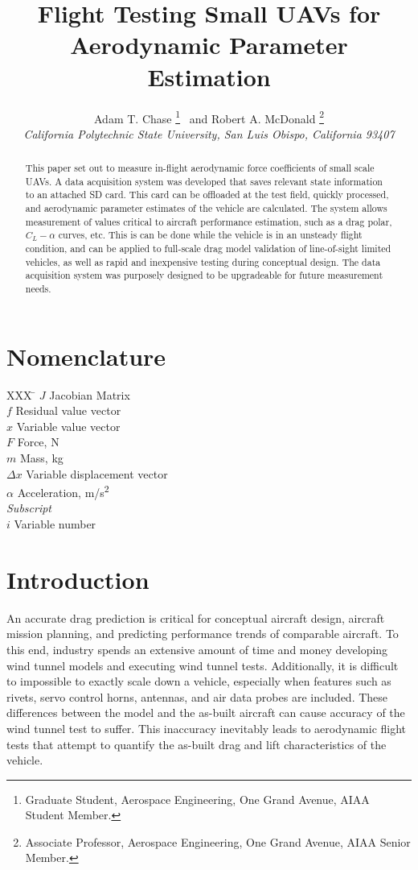 \documentclass[]{aiaa-tc}%
\title{Flight Testing Small UAVs for Aerodynamic Parameter Estimation}
\author{
  Adam T. Chase%
    \thanks{Graduate Student, Aerospace Engineering, One Grand Avenue, AIAA Student Member.}\thanksibid{1}
  \ and Robert A. McDonald
\thanks{Associate Professor, Aerospace Engineering, One Grand Avenue, AIAA Senior Member.}\\
  {\normalsize\itshape
   California Polytechnic State University, San Luis Obispo, California 93407}\\
 }
\begin{document}
\maketitle

\begin{abstract}
This paper set out to measure in-flight aerodynamic force coefficients of small scale UAVs. A data acquisition system was developed that saves relevant state information to an attached SD card. This card can be offloaded at the test field, quickly processed, and aerodynamic parameter estimates of the vehicle are calculated. The system allows measurement of values critical to aircraft performance estimation, such as a drag polar, $C_L-\alpha$ curves, etc. This is can be done while the vehicle is in an unsteady flight condition, and can be applied to full-scale drag model validation of line-of-sight limited vehicles, as well as rapid and inexpensive testing during conceptual design. The data acquisition system was purposely designed to be upgradeable for future measurement needs.
\end{abstract}

\section*{Nomenclature}

\begin{tabbing}
  XXX \= \kill%
  $J$ \> Jacobian Matrix \\
  $f$ \> Residual value vector \\
  $x$ \> Variable value vector \\
  $F$ \> Force, N \\
  $m$ \> Mass, kg \\
  $\Delta x$ \> Variable displacement vector \\
  $\alpha$ \> Acceleration, m/s\textsuperscript{2} \\[5pt]
  \textit{Subscript}\\
  $i$ \> Variable number \\
 \end{tabbing}

\section{Introduction}
An accurate drag prediction is critical for conceptual aircraft design, aircraft mission planning, and predicting performance trends of comparable aircraft. To this end, industry spends an extensive amount of time and money developing wind tunnel models and executing wind tunnel tests. Additionally, it is difficult to impossible to exactly scale down a vehicle, especially when features such as rivets, servo control horns, antennas, and air data probes are included. These differences between the model and the as-built aircraft can cause accuracy of the wind tunnel test to suffer. This inaccuracy inevitably leads to aerodynamic flight tests that attempt to quantify the as-built drag and lift characteristics of the vehicle.
\end{document}
